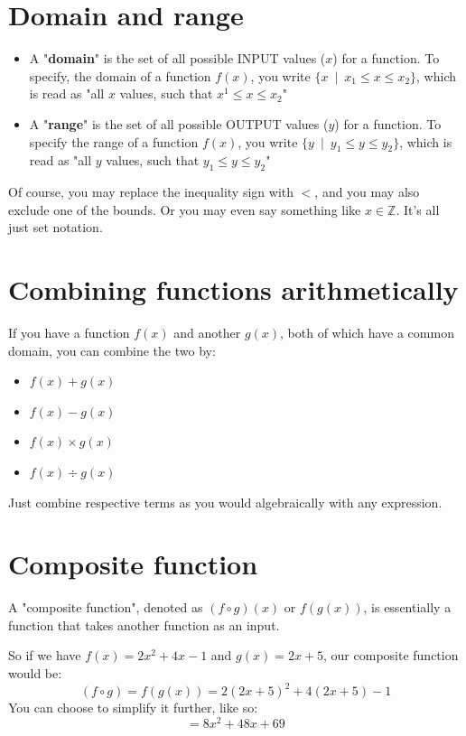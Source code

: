 \documentclass{article}
\begin{document}
\section{Domain and range}
\begin{itemize}
    \item A "\textbf{domain}" is the set of all possible INPUT values ($x$) for a function. To specify, the domain of a function $f(x)$, you write $\{x \phantom{1}| \phantom{1} x_1 \leq x \leq x_2 \}$, which is read as "all $x$ values, such that $x^1 \leq x \leq x_2$"
    \item A "\textbf{range}" is the set of all possible OUTPUT values ($y$) for a function. To specify the range of a function $f(x)$, you write $\{y \phantom{1}| \phantom{1} y_1 \leq y \leq y_2 \}$, which is read as "all $y$ values, such that $y_1 \leq y \leq y_2$"
    
\end{itemize}
Of course, you may replace the inequality sign with $<$, and you may also exclude one of the bounds. Or you may even say something like $x\in\mathbb{Z}$. It's all just set notation.

\section{Combining functions arithmetically}

If you have a function $f(x)$ and another $g(x)$, both of which have a common domain, you can combine the two by:
\begin{itemize}
    \item $f(x) + g(x)$
    \item $f(x) - g(x)$
    \item $f(x)\times g(x)$
    \item $f(x)\div g(x)$
\end{itemize}

\noindent Just combine respective terms as you would algebraically with any expression.

\section{Composite function}
A "composite function", denoted as $(f \circ g)(x)$ or $f(g(x))$, is essentially a function that takes another function as an input.

\begin{center}
    So if we have $f(x)=2x^2+4x-1$ and $g(x)=2x+5$, our composite function would be:
    $$(f\circ g)=f(g(x))=2(2x+5)^2+4(2x+5)-1$$
    You can choose to simplify it further, like so:
    $$=8x^2+48x+69$$
\end{center}
\end{document}
